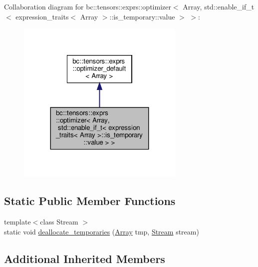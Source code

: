 Collaboration diagram for bc\+:\+:tensors\+:\+:exprs\+:\+:optimizer$<$ Array, std\+:\+:enable\+\_\+if\+\_\+t$<$ expression\+\_\+traits$<$ Array $>$\+:\+:is\+\_\+temporary\+:\+:value $>$ $>$\+:\nopagebreak
\begin{figure}[H]
\begin{center}
\leavevmode
\includegraphics[width=227pt]{structbc_1_1tensors_1_1exprs_1_1optimizer_3_01Array_00_01std_1_1enable__if__t_3_01expression__trd9e8555322a03035686b027da9769dd3}
\end{center}
\end{figure}
\subsection*{Static Public Member Functions}
\begin{DoxyCompactItemize}
\item 
{\footnotesize template$<$class Stream $>$ }\\static void \hyperlink{structbc_1_1tensors_1_1exprs_1_1optimizer_3_01Array_00_01std_1_1enable__if__t_3_01expression__tr6f024f979d44d7dd29d94a5b5f9e889b_abcf673bed3079a33921f08a1eb084070}{deallocate\+\_\+temporaries} (\hyperlink{structbc_1_1tensors_1_1exprs_1_1Array}{Array} tmp, \hyperlink{classbc_1_1streams_1_1Stream}{Stream} stream)
\end{DoxyCompactItemize}
\subsection*{Additional Inherited Members}


